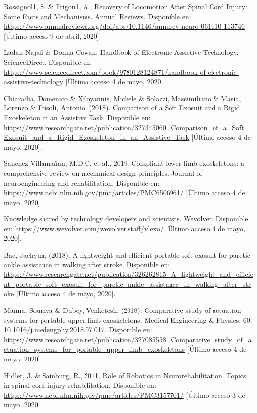 \begin{thebibliography}{99}
 Rossignol1, S. \& Frigon1, A., Recovery of Locomotion After Spinal Cord Injury: Some Facts and Mechanisms. Annual Reviews.  Disponible en: \url{https://www.annualreviews.org/doi/abs/10.1146/annurev-neuro-061010-113746} [Último acceso 9 de abril, 2020].

 Ladan Najafi \& Donna Cowan, Handbook of Electronic Assistive Technology. ScienceDirect. Disponible en: \url{https://www.sciencedirect.com/book/9780128124871/handbook-of-electronic-assistive-technology} [Último acceso 4 de mayo, 2020].

 Chiaradia, Domenico \& Xiloyannis, Michele \& Solazzi, Massimiliano \& Masia, Lorenzo \& Frisoli, Antonio. (2018). Comparison of a Soft Exosuit and a Rigid Exoskeleton in an Assistive Task.  Disponible en: \url{https://www.researchgate.net/publication/327345060_Comparison_of_a_Soft_Exosuit_and_a_Rigid_Exoskeleton_in_an_Assistive_Task} [Último acceso 4 de mayo, 2020].

 Sanchez-Villamañan, M.D.C. et al., 2019. Compliant lower limb exoskeletons: a comprehensive review on mechanical design principles. Journal of neuroengineering and rehabilitation. Disponible en: \url{https://www.ncbi.nlm.nih.gov/pmc/articles/PMC6506961/} [Último acceso 4 de mayo, 2020].

  Knowledge shared by technology developers and scientists. Wevolver. Disponible en: \url{https://www.wevolver.com/wevolver.staff/vlexo/} [Último acceso 4 de mayo, 2020].

 Bae, Jaehyun. (2018). A lightweight and efficient portable soft exosuit for paretic ankle assistance in walking after stroke.  Disponible en: \url{https://www.researchgate.net/publication/326262815_A_lightweight_and_efficient_portable_soft_exosuit_for_paretic_ankle_assistance_in_walking_after_stroke} [Último acceso 4 de mayo, 2020].

 Manna, Soumya \& Dubey, Venketesh. (2018). Comparative study of actuation systems for portable upper limb exoskeletons. Medical Engineering \& Physics. 60. 10.1016/j.medengphy.2018.07.017.  Disponible en: \url{https://www.researchgate.net/publication/327085558_Comparative_study_of_actuation_systems_for_portable_upper_limb_exoskeletons} [Último acceso 4 de mayo, 2020].

 Hidler, J. \& Sainburg, R., 2011. Role of Robotics in Neurorehabilitation. Topics in spinal cord injury rehabilitation. Disponible en: \url{https://www.ncbi.nlm.nih.gov/pmc/articles/PMC3157701/} [Último acceso 3 de mayo, 2020].


\end{thebibliography}

